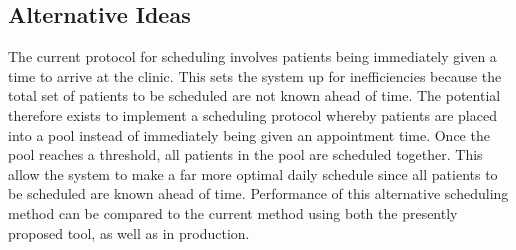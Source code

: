 \documentclass[12pt, titlepage]{article}
\begin{document}
\subsection{Alternative Ideas}
The current protocol for scheduling involves patients being immediately given a time to arrive at the clinic. This sets the system up for inefficiencies because the total set of patients to be scheduled are not known ahead of time. The potential therefore exists to implement a scheduling protocol whereby patients are placed into a pool instead of immediately being given an appointment time. Once the pool reaches a threshold, all patients in the pool are scheduled together. This allow the system to make a far more optimal daily schedule since all patients to be scheduled are known ahead of time. Performance of this alternative scheduling method can be compared to the current method using both the presently proposed tool, as well as in production.
\end{document}
